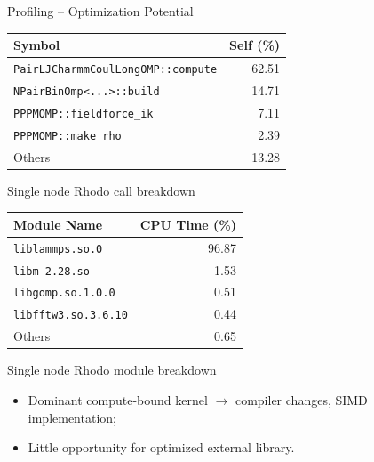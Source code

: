 \documentclass[aspectratio=169, handout]{beamer}
\begin{document}
\begin{frame}{Profiling -- Optimization Potential}
    \vspace{0.5\baselineskip}

    \centering
    \begin{minipage}{0.54\textwidth}
        \small
        \centering
        \begin{tabular}{lr}
            \toprule
            \textbf{Symbol}                           & {\textbf{Self (\%)}} \\
            \midrule
            \texttt{PairLJCharmmCoulLongOMP::compute} &    \color{red} 62.51 \\
            \texttt{NPairBinOmp<...>::build}          &                14.71 \\
            \texttt{PPPMOMP::fieldforce\_ik}          &                 7.11 \\
            \texttt{PPPMOMP::make\_rho}               &                 2.39 \\
            \midrule
            Others                                    &                13.28 \\
            \bottomrule
        \end{tabular}

        \vspace{0.5\baselineskip}
        \small Single node Rhodo call breakdown
    \end{minipage}
    \begin{minipage}{0.44\textwidth}
        \small
        \centering
        \begin{tabular}{lr}
                \toprule
                \textbf{Module Name}        & {\textbf{CPU Time (\%)}} \\
                \midrule
                \texttt{liblammps.so.0}     &        \color{red} 96.87 \\
                \texttt{libm-2.28.so}       &                     1.53 \\
                \texttt{libgomp.so.1.0.0}   &                     0.51 \\
                \texttt{libfftw3.so.3.6.10} &        \color{blue} 0.44 \\
                \midrule
                Others                      &                     0.65 \\
                \bottomrule
        \end{tabular}

        \vspace{0.5\baselineskip}
        \small Single node Rhodo module breakdown
    \end{minipage}

    \vspace{\baselineskip}
    \begin{itemize}
        \item Dominant compute-bound kernel $\rightarrow$ compiler changes, SIMD implementation;
        \item Little opportunity for optimized external library.
    \end{itemize}
\end{frame}
\end{document}
